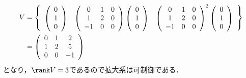 \begin{frame}[t]
\begin{align}
 V &=
 \left\{
 \begin{array}{ccc}
 \left(
 \begin{array}{c}
  0 \\
  1 \\
  0
 \end{array}
 \right) &
 \left(
 \begin{array}{ccc}
  0 & 1 & 0 \\
  1 & 2 & 0 \\
  -1 & 0 & 0 \\
 \end{array}
 \right)
 \left(
 \begin{array}{c}
  0 \\
  1 \\
  0
 \end{array}
 \right) &
 \left(
 \begin{array}{ccc}
  0 & 1 & 0 \\
  1 & 2 & 0 \\
  -1 & 0 & 0 \\
 \end{array}
 \right)^2
 \left(
 \begin{array}{c}
  0 \\
  1 \\
  0
 \end{array}
 \right)
 \end{array}
 \right\} \notag\\&=
 \left(
 \begin{array}{ccc}
  0 & 1 & 2 \\
  1 & 2 & 5 \\
  0 & 0 & -1 \\
 \end{array}
 \right)\notag
\end{align}
となり，$\rank V = 3$であるので拡大系は可制御である．
\end{frame}


